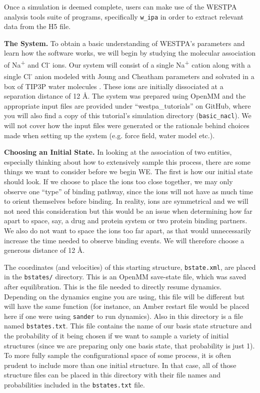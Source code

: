 \documentclass[9pt,tutorial,pubversion]{livecoms}
\begin{document}
Once a simulation is deemed complete, users can make use of the WESTPA analysis tools suite of programs, specifically \verb|w_ipa| in order to extract relevant data from the H5 file.

\textbf{The System.} To obtain a basic understanding of WESTPA’s parameters and learn how the software works, we will begin by studying the molecular association of Na\textsuperscript{+} and Cl\textsuperscript{-} ions. 
Our system will consist of a single Na\textsuperscript{+} cation along with a single Cl\textsuperscript{-} anion modeled with Joung and Cheatham parameters \citep{JoungCheatham2009} and solvated in a box of TIP3P water molecules \citep{tip3p}. 
These ions are initially dissociated at a separation distance of 12 \AA. 
The system was prepared using OpenMM and the appropriate input files are provided under “westpa\_tutorials” on GitHub, where you will also find a copy of this tutorial’s simulation directory (\verb|basic_nacl|). 
We will not cover how the input files were generated or the rationale behind choices made when setting up the system (e.g. force field, water model etc.).


\textbf{Choosing an Initial State.} In looking at the association of two entities, especially thinking about how to extensively sample this process, there are some things we want to consider before we begin WE.
The first is how our initial state should look. If we choose to place the ions too close together, we may only observe one “type” of binding pathway, since the ions will not have as much time to orient themselves before binding. 
In reality, ions are symmetrical and we will not need this consideration but this would be an issue when determining how far apart to space, say, a drug and protein system or two protein binding partners. 
We also do not want to space the ions too far apart, as that would unnecessarily increase the time needed to observe binding events. 
We will therefore choose a generous distance of 12 \AA.

The coordinates (and velocities) of this starting structure, \verb|bstate.xml|, are placed in the \verb|bstates/| directory. 
This is an OpenMM save-state file, which was saved after equilibration.  
This is the file needed to directly resume dynamics.  
Depending on the dynamics engine you are using, this file will be different but will have the same function (for instance, an Amber restart file would be placed here if one were using \verb|sander| to run dynamics).
Also in this directory is a file named \verb|bstates.txt|. 
This file contains the name of our basis state structure and the probability of it being chosen if we want to sample a variety of initial structures (since we are preparing only one basis state, that probability is just 1). 
To more fully sample the configurational space of some process, it is often prudent to include more than one initial structure. 
In that case, all of those structure files can be placed in this directory with their file names and probabilities included in the \verb|bstates.txt| file.
\end{document}
